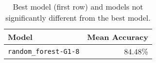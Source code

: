 \begin{table}[H]
\centering
\capstart
\begin{tabularx}{0.48\textwidth}{|X|r|}
\hline
Model & Mean Accuracy \\
\hline
\texttt{random\_forest-G1-8} & 84.48\% \\
\hline
\end{tabularx}
\caption{Best model (first row) and models not significantly different from the best model.}
\label{tab:best_models}

\end{table}
